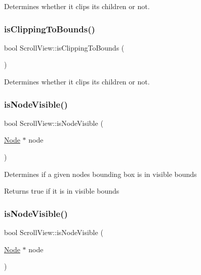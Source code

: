 Determines whether it clips its children or not. \mbox{\label{classScrollView_a7c5e4247b97f795d120e68b1fbee751e}} 
\subsubsection{\texorpdfstring{is\+Clipping\+To\+Bounds()}{isClippingToBounds()}\hspace{0.1cm}{\footnotesize\ttfamily [2/2]}}
{\footnotesize\ttfamily bool Scroll\+View\+::is\+Clipping\+To\+Bounds (\begin{DoxyParamCaption}{ }\end{DoxyParamCaption})\hspace{0.3cm}{\ttfamily [inline]}}

Determines whether it clips its children or not. \mbox{\label{classScrollView_a0605de8c4ddbb06479cfdb8eee65e41e}} 
\subsubsection{\texorpdfstring{is\+Node\+Visible()}{isNodeVisible()}\hspace{0.1cm}{\footnotesize\ttfamily [1/2]}}
{\footnotesize\ttfamily bool Scroll\+View\+::is\+Node\+Visible (\begin{DoxyParamCaption}\item[{\hyperlink{classNode}{Node} $\ast$}]{node }\end{DoxyParamCaption})}

Determines if a given node\textquotesingle{}s bounding box is in visible bounds

\begin{DoxyReturn}{Returns}
true if it is in visible bounds 
\end{DoxyReturn}
\mbox{\label{classScrollView_a0605de8c4ddbb06479cfdb8eee65e41e}} 
\subsubsection{\texorpdfstring{is\+Node\+Visible()}{isNodeVisible()}\hspace{0.1cm}{\footnotesize\ttfamily [2/2]}}
{\footnotesize\ttfamily bool Scroll\+View\+::is\+Node\+Visible (\begin{DoxyParamCaption}\item[{\hyperlink{classNode}{Node} $\ast$}]{node }\end{DoxyParamCaption})}

